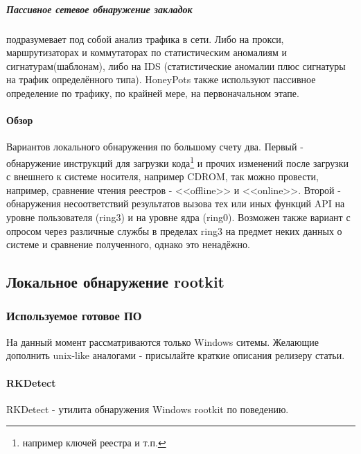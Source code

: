 \subparagraph{Пассивное сетевое обнаружение закладок}
 подразумевает под
 собой анализ трафика в сети. Либо на прокси, маршрутизаторах и
коммутаторах по статистическим аномалиям и сигнатурам(шаблонам), либо на IDS
(статистические аномалии плюс сигнатуры на трафик определённого типа).
HoneyPots  также используют пассивное определение по трафику, по крайней мере, на
первоначальном этапе.

\paragraph{Обзор\\}
Вариантов локального обнаружения по большому счету два. Первый -
обнаружение инструкций для загрузки кода\footnote{например ключей реестра и т.п.}
и прочих изменений после загрузки с внешнего к системе носителя, например CDROM,
так можно провести, например, сравнение чтения реестров - <<offline>> и <<online>>.
Второй - обнаружения несоответствий результатов вызова тех или иных функций API
на уровне пользователя (ring3) и на уровне ядра (ring0). Возможен также вариант с
опросом через различные службы в пределах ring3 на предмет неких данных о системе
и сравнение полученного, однако это ненадёжно.

\subsection{Локальное обнаружение rootkit}

\subsubsection{Используемое готовое ПО}

На данный момент рассматриваются только Windows ситемы. Желающие дополнить unix-like аналогами - присылайте краткие описания релизеру статьи.

\paragraph{RKDetect\\}
RKDetect - утилита обнаружения Windows rootkit по поведению.

